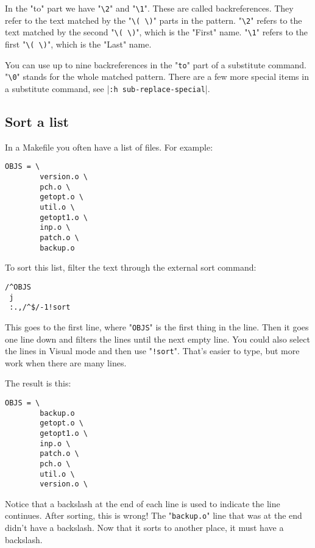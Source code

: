 In the "to" part we have "\texttt{\textbackslash{}2}" and "\texttt{\textbackslash{}1}".
These are called backreferences.
They refer to the text matched by the "\texttt{\textbackslash{}( \textbackslash{})}" parts in the pattern.
"\texttt{\textbackslash{}2}" refers to the text matched by the second "\texttt{\textbackslash{}( \textbackslash{})}", which is the "First" name.
"\texttt{\textbackslash{}1}" refers to the first "\texttt{\textbackslash{}( \textbackslash{})}", which is the "Last" name.

You can use up to nine backreferences in the "\texttt{to}" part of a substitute command.
"\texttt{\textbackslash{}0}" stands for the whole matched pattern.
There are a few more special items in a substitute command, see |\texttt{:h sub-replace-special}|.
\subsection{Sort a list}

In a Makefile you often have a list of files.
For example:

\begin{Verbatim}[samepage=true]
    OBJS = \ 
        version.o \ 
        pch.o \ 
        getopt.o \ 
        util.o \ 
        getopt1.o \ 
        inp.o \ 
        patch.o \ 
        backup.o 
\end{Verbatim}

To sort this list, filter the text through the external sort command:

\begin{Verbatim}[samepage=true]
 /^OBJS
 j
 :.,/^$/-1!sort
\end{Verbatim}

This goes to the first line, where "\texttt{OBJS}" is the first thing in the line.
Then it goes one line down and filters the lines until the next empty line.
You could also select the lines in Visual mode and then use "\texttt{!sort}".
That's easier to type, but more work when there are many lines.

The result is this:

\begin{Verbatim}[samepage=true]
    OBJS = \ 
        backup.o 
        getopt.o \ 
        getopt1.o \ 
        inp.o \ 
        patch.o \ 
        pch.o \ 
        util.o \ 
        version.o \ 
\end{Verbatim}

Notice that a backslash at the end of each line is used to indicate the line continues.
After sorting, this is wrong!
The "\texttt{backup.o}" line that was at the end didn't have a backslash.
Now that it sorts to another place, it must have a backslash.

